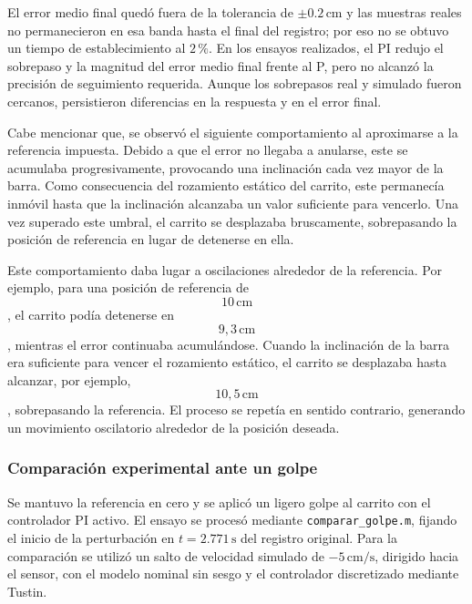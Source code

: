 \documentclass[a4paper, twoside, 10pt, spanish]{article}
\numberwithin{table}{section}
\begin{document}
    El error medio final quedó fuera de la tolerancia de $\pm0.2\,\text{cm}$ y las muestras reales no permanecieron en esa banda hasta el final del registro; por eso no se obtuvo un tiempo de establecimiento al $2\,\%$. En los ensayos realizados, el PI redujo el sobrepaso y la magnitud del error medio final frente al P, pero no alcanzó la precisión de seguimiento requerida. Aunque los sobrepasos real y simulado fueron cercanos, persistieron diferencias en la respuesta y en el error final.

    Cabe mencionar que, se observó el siguiente comportamiento al aproximarse a la referencia impuesta. Debido a que el error no llegaba a anularse, este se acumulaba progresivamente, provocando una inclinación cada vez mayor de la barra. Como consecuencia del rozamiento estático del carrito, este permanecía inmóvil hasta que la inclinación alcanzaba un valor suficiente para vencerlo. Una vez superado este umbral, el carrito se desplazaba bruscamente, sobrepasando la posición de referencia en lugar de detenerse en ella.

    Este comportamiento daba lugar a oscilaciones alrededor de la referencia. Por ejemplo, para una posición de referencia de $$10\,\text{cm}$$, el carrito podía detenerse en $$9{,}3\,\text{cm}$$, mientras el error continuaba acumulándose. Cuando la inclinación de la barra era suficiente para vencer el rozamiento estático, el carrito se desplazaba hasta alcanzar, por ejemplo, $$10{,}5\,\text{cm}$$, sobrepasando la referencia. El proceso se repetía en sentido contrario, generando un movimiento oscilatorio alrededor de la posición deseada.

    \subsubsection{Comparación experimental ante un golpe}
    Se mantuvo la referencia en cero y se aplicó un ligero golpe al carrito con el controlador PI activo. El ensayo se procesó mediante \texttt{comparar\_golpe.m}, fijando el inicio de la perturbación en $t=2.771\,\text{s}$ del registro original. Para la comparación se utilizó un salto de velocidad simulado de $-5\,\text{cm/s}$, dirigido hacia el sensor, con el modelo nominal sin sesgo y el controlador discretizado mediante Tustin.
\end{document}
